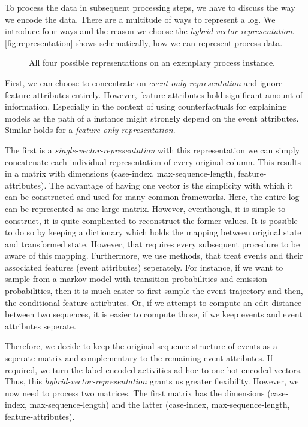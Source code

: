 \documentclass[./../../paper.tex]{subfiles}
\begin{document}
To process the data in subsequent processing steps, we have to discuss the way we encode the data. There are a multitude of ways to represent a log. We introduce four ways and the reason we choose the \emph{hybrid-vector-representation}. \autoref{fig:representation} shows schematically, how we can represent process data. 

\begin{figure}[htbp]
    \centering
    
    
    \caption{All four possible representations on an exemplary process instance.}
    \label{fig:representation}
\end{figure}


First, we can choose to concentrate on \emph{event-only-representation} and ignore feature attributes entirely. However, feature attributes hold significant amount of information. Especially in the context of using counterfactuals for explaining models as the path of a \gls{instance} might strongly depend on the event attributes. Similar holds for a \emph{feature-only-representation}.

The first is a \emph{single-vector-representation} with this representation we can simply concatenate each individual representation of every original column. This results in a matrix with dimensions (case-index, max-sequence-length, feature-attributes). The advantage of having one vector is the simplicity with which it can be constructed and used for many common frameworks. Here, the entire log can be represented as one large matrix. However, eventhough, it is simple to construct, it is quite complicated to reconstruct the former values. It is possible to do so by keeping a dictionary which holds the mapping between original state and transformed state. However, that requires every subsequent procedure to be aware of this mapping. Furthermore, we use methods, that treat events and their associated features (event attributes) seperately. For instance, if we want to sample from a markov model with transition probabilities and emission probabilities, then it is much easier to first sample the event trajectory and then, the conditional feature attirbutes. Or, if we attempt to compute an edit distance between two sequences, it is easier to compute those, if we keep events and event attributes seperate.

Therefore, we decide to keep the original sequence structure of events as a seperate matrix and complementary to the remaining event attributes. If required, we turn the label encoded activities ad-hoc to one-hot encoded vectors. Thus, this \emph{hybrid-vector-representation} grants us greater flexibility. However, we now need to process two matrices. The first matrix has the dimensions (case-index, max-sequence-length) and the latter (case-index, max-sequence-length, feature-attributes). 
\end{document}
